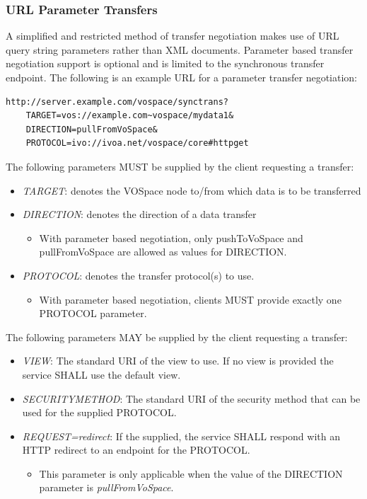 \documentclass[11pt,a4paper]{ivoa}
\begin{document}
\subsubsection{URL Parameter Transfers}
\label{subsubsec:url parameter transfers}
A simplified and restricted method of transfer negotiation makes use of URL query string parameters rather than XML documents.  Parameter based transfer negotiation support is optional and is limited to the synchronous transfer endpoint.  The following is an example URL for a parameter transfer negotiation:

\begin{verbatim}
http://server.example.com/vospace/synctrans?
    TARGET=vos://example.com~vospace/mydata1&
    DIRECTION=pullFromVoSpace&
    PROTOCOL=ivo://ivoa.net/vospace/core#httpget
\end{verbatim}

The following parameters MUST be supplied by the client requesting a transfer:

\begin{itemize}
    \item \emph{TARGET}: denotes the VOSpace node to/from which data is to be transferred
    \item \emph{DIRECTION}: denotes the direction of a data transfer
        \begin{itemize}
            \item With parameter based negotiation, only pushToVoSpace and pullFromVoSpace are allowed as values for DIRECTION.
        \end{itemize}
    \item \emph{PROTOCOL}: denotes the transfer protocol(s) to use. 
        \begin{itemize}
            \item With parameter based negotiation, clients MUST provide exactly one PROTOCOL parameter.
        \end{itemize}
\end{itemize}

The following parameters MAY be supplied by the client requesting a transfer:

\begin{itemize}
    \item \emph{VIEW}: The standard URI of the view to use.  If no view is provided the service SHALL use the default view.
    \item \emph{SECURITYMETHOD}: The standard URI of the security method that can be used for the supplied PROTOCOL.
    \item \emph{REQUEST=redirect}: If the supplied, the service SHALL respond with an HTTP redirect to an endpoint for the PROTOCOL.
    \begin{itemize}
        \item This parameter is only applicable when the value of the DIRECTION parameter is \emph{pullFromVoSpace}.
    \end{itemize}
\end{itemize}
\end{document}
